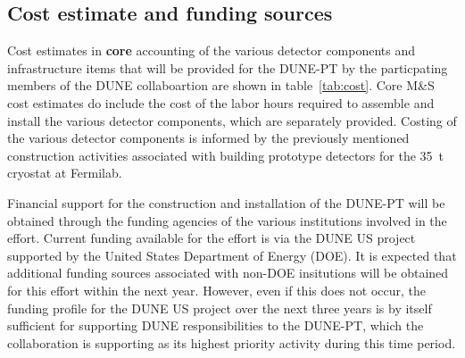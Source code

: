 




%

\subsection{Cost estimate and funding sources}
Cost estimates in {\bf core}  accounting of the various detector components and infrastructure items that 
will be provided for the DUNE-PT by the particpating members of the DUNE collaboartion are shown in 
table~\ref{tab:cost}.  Core M\&S cost estimates do include the cost of the labor hours required to 
assemble and install the various detector components, which are separately provided.  Costing of the 
various detector components is informed by the previously mentioned construction activities associated 
with building prototype detectors for the 35~t cryostat at Fermilab.

Financial support for the construction and installation of the DUNE-PT will be obtained through the 
funding agencies of the various institutions involved in the effort.  Current funding available for 
the effort is via the DUNE US project supported by the United States Department of Energy (DOE).  It 
is expected that additional funding sources associated with non-DOE insitutions will be obtained for 
this effort within the next year.  However, even if this does not occur, the funding profile for the 
DUNE US project over the next three years is by itself sufficient for supporting DUNE responsibilities 
to the DUNE-PT, which the collaboration is supporting as its highest priority activity during this 
time period.      
  

